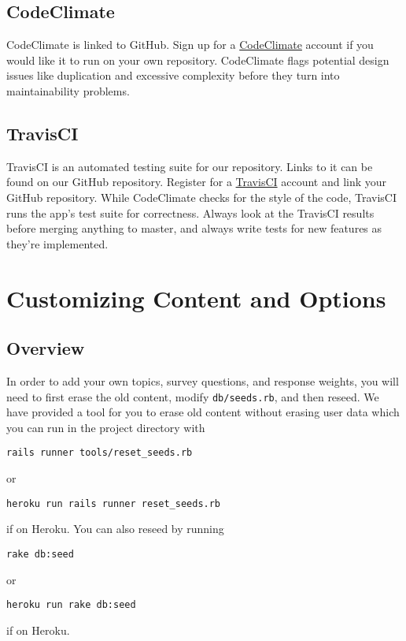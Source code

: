 \documentclass[12pt]{article}
\begin{document}
\subsection{CodeClimate}
CodeClimate is linked to GitHub. Sign up for a
\href{https://codeclimate.com}{CodeClimate} account if you would like it to run
on your own repository. CodeClimate flags potential design issues like
duplication and excessive complexity before they turn into maintainability
problems.

\subsection{TravisCI}
TravisCI is an automated testing suite for our repository. Links to it can be
found on our GitHub repository.  Register for a
\href{https://travis-ci.org/}{TravisCI} account and link your GitHub repository.
While CodeClimate checks for the style of the code, TravisCI runs the app's test
suite for correctness. Always look at the TravisCI results before merging
anything to master, and always write tests for new features as they're
implemented.

\section{Customizing Content and Options}
\subsection{Overview}
In order to add your own topics, survey questions, and response weights, you
will need to first erase the old content, modify \texttt{db/seeds.rb}, and then reseed.
We have provided a tool for you to erase old content without erasing user data
which you can run in the project directory with
\begin{verbatim}
rails runner tools/reset_seeds.rb
\end{verbatim}
or
\begin{verbatim}
heroku run rails runner reset_seeds.rb
\end{verbatim}
if on Heroku. You can also reseed by running
\begin{verbatim}
rake db:seed
\end{verbatim}
or
\begin{verbatim}
heroku run rake db:seed
\end{verbatim}
if on Heroku.
\end{document}
